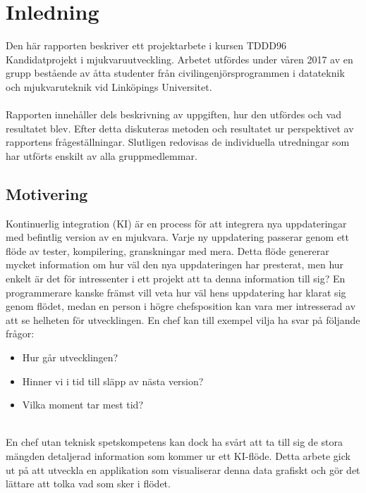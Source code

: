 \chapter{Inledning}
\label{cha:inledning}
Den här rapporten beskriver ett projektarbete i kursen TDDD96 Kandidatprojekt i mjukvaruutveckling. Arbetet utfördes under våren 2017 av en grupp bestående av åtta studenter från civilingenjörsprogrammen i datateknik och mjukvaruteknik vid Linköpings Universitet.
\\ \\
Rapporten innehåller dels beskrivning av uppgiften, hur den utfördes och vad resultatet blev. Efter detta diskuteras metoden och resultatet ur perspektivet av rapportens frågeställningar. Slutligen redovisas de  individuella utredningar som har utförts enskilt av alla gruppmedlemmar.

\section{Motivering}
\label{sec:motivering}
Kontinuerlig integration (KI) är en process för att integrera nya uppdateringar med befintlig version av en mjukvara. Varje ny uppdatering passerar genom ett flöde av tester, kompilering, granskningar med mera. Detta flöde genererar mycket information om hur väl den nya uppdateringen har presterat, men hur enkelt är det för intressenter i ett projekt att ta denna information till sig? En programmerare kanske främst vill veta hur väl hens uppdatering har klarat sig genom flödet, medan en person i högre chefsposition kan vara mer intresserad av att se helheten för utvecklingen. En chef kan till exempel vilja ha svar på följande frågor:
\begin{itemize}
\item Hur går utvecklingen? 
\item Hinner vi i tid till släpp av nästa version? 
\item Vilka moment tar mest tid?
\end{itemize}
\ \\
En chef utan teknisk spetskompetens kan dock ha svårt att ta till sig de stora mängden detaljerad information som kommer ur ett KI-flöde. Detta arbete gick ut på att utveckla en applikation som visualiserar denna data grafiskt och gör det lättare att tolka vad som sker i flödet.


